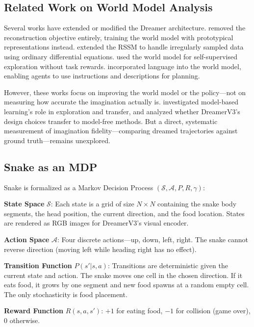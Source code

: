 \documentclass[letterpaper]{article}
\begin{document}
\subsection{Related Work on World Model Analysis}

Several works have extended or modified the Dreamer architecture. \citet{deng2022dreamerpro} removed the reconstruction objective entirely, training the world model with prototypical representations instead. \citet{zhang2023oderssm} extended the RSSM to handle irregularly sampled data using ordinary differential equations. \citet{sekar2020plan2explore} used the world model for self-supervised exploration without task rewards. \citet{lin2024dynalang} incorporated language into the world model, enabling agents to use instructions and descriptions for planning.

However, these works focus on improving the world model or the policy---not on measuring how accurate the imagination actually is. \citet{walker2023modelbased} investigated model-based learning's role in exploration and transfer, and \citet{sullivan2023rewardscale} analyzed whether DreamerV3's design choices transfer to model-free methods. But a direct, systematic measurement of imagination fidelity---comparing dreamed trajectories against ground truth---remains unexplored.

\subsection{Snake as an MDP}

Snake is formalized as a Markov Decision Process $(\mathcal{S}, \mathcal{A}, P, R, \gamma)$:

\textbf{State Space} $\mathcal{S}$: Each state is a grid of size $N \times N$ containing the snake body segments, the head position, the current direction, and the food location. States are rendered as RGB images for DreamerV3's visual encoder.

\textbf{Action Space} $\mathcal{A}$: Four discrete actions---up, down, left, right. The snake cannot reverse direction (moving left while heading right has no effect).

\textbf{Transition Function} $P(s'|s,a)$: Transitions are deterministic given the current state and action. The snake moves one cell in the chosen direction. If it eats food, it grows by one segment and new food spawns at a random empty cell. The only stochasticity is food placement.

\textbf{Reward Function} $R(s,a,s')$: $+1$ for eating food, $-1$ for collision (game over), $0$ otherwise.
\end{document}
